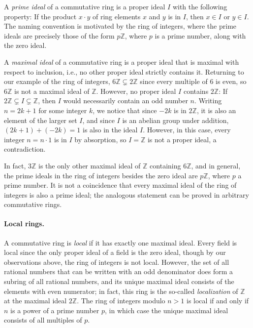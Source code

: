\documentclass{article}
\begin{document}
A \emph{prime ideal} of a commutative ring is a proper ideal $I$ with the
following property:   If the product $x \cdot y$ of ring elements $x$ and $y$
is in $I$, then $x \in I$ or $y \in I$. The naming convention is motivated by
the ring of integers, where the prime ideals are precisely those  of the form
$p\mathbb{Z}$, where $p$ is a prime number, along with the zero ideal. 

A \emph{maximal ideal} of a commutative ring is a proper ideal that is maximal
with respect to inclusion, i.e., no other proper ideal strictly contains it. 
Returning to our example of the ring of integers,
$6 \mathbb{Z} \subsetneq 2 \mathbb{Z}$ since every multiple of $6$ is even, so
$6 \mathbb{Z}$ is not a maximal ideal of $\mathbb{Z}$. However, no proper ideal
$I$ contains $2 \mathbb{Z}$: If $2\mathbb{Z}\subsetneq I\subsetneq \mathbb{Z}$,
then $I$  would necessarily contain an odd number $n$. Writing $n=2k+1$ for
some integer $k$, we notice that since $-2k$ is in $2\mathbb{Z}$, it is also an
element of the larger set $I$, and since $I$ is an abelian group under
addition, $(2k+1) + (-2k) = 1$ is also in the ideal $I$. However, in this case,
every integer $n = n \cdot 1$ is in $I$ by absorption, so $I = \mathbb{Z}$ is
not a proper ideal, a contradiction. 

In fact, $3 \mathbb{Z}$ is the only other maximal ideal of $\mathbb{Z}$
containing $6 \mathbb{Z}$, and in general, the prime ideals in the ring of
integers besides the zero ideal are  $p \mathbb{Z}$, where $p$ a prime number. 
It is not a coincidence that every maximal ideal of the ring of integers is
also a prime  ideal; the analogous statement can be proved in arbitrary
commutative rings.

\paragraph{Local rings.}
A commutative ring is \emph{local} if it has exactly one maximal ideal. 
Every field is local since the only proper ideal of a field is the zero ideal,
though by our observations above, the ring of integers is not local. 
However, the set of all rational numbers that can be written with an odd
denominator does form a subring of all rational numbers, and its unique maximal
ideal consists of the elements with even numerator; in fact, this ring is the
so-called \emph{localization} of $\mathbb{Z}$ at the maximal ideal
$2\mathbb{Z}$. The ring of integers modulo $n>1$ is local if and only if $n$ is
a power of a prime number $p$, in which case the unique maximal ideal consists
of all multiples of $p$. 
\end{document}
